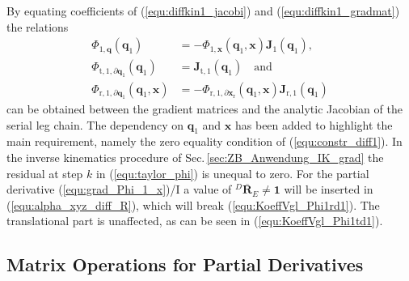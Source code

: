 \documentclass[robotics,article,submit,moreauthors,pdftex]{Definitions/mdpi}
\newcommand{\bm}[1]{\boldsymbol{#1}}
\newcommand{\rotmato}[2]{{{ }^{#1}\boldsymbol{\overline{R}}}_{#2}}
\let\Phi\varPhi
\begin{document}
%
By equating coefficients of (\ref{equ:diffkin1_jacobi}) and (\ref{equ:diffkin1_gradmat}) the relations
%
\begin{align}
\bm{\Phi}_{1,\bm{q}}(\bm{q}_1)
&=
-\bm{\Phi}_{1,\bm{x}}(\bm{q}_1,\bm{x})
\bm{J}_1(\bm{q}_1),
\label{equ:KoeffVgl_Phi1d1}
\\
\bm{\Phi}_{\mathrm{t},1,\partial\bm{q}_1}(\bm{q}_1)
&=
\bm{J}_{\mathrm{t},1}(\bm{q}_1)\quad\mathrm{and}
\label{equ:KoeffVgl_Phi1td1}
\\
\bm{\Phi}_{\mathrm{r},1,\partial\bm{q}_1}(\bm{q}_1,\bm{x})
&=
-\bm{\Phi}_{\mathrm{r},1,\partial\bm{x}_\mathrm{r}}(\bm{q}_1,\bm{x}) \bm{J}_{\mathrm{r},1}(\bm{q}_1)
\label{equ:KoeffVgl_Phi1rd1}
\end{align}
%
can be obtained between the gradient matrices and the analytic Jacobian of the serial leg chain.
The dependency on $\bm{q}_1$ and $\bm{x}$ has been added to highlight the main requirement, namely the zero equality condition of (\ref{equ:constr_diff1}).
In the inverse kinematics procedure of Sec.\,\ref{sec:ZB_Anwendung_IK_grad} the residual at step $k$ in (\ref{equ:taylor_phi}) is unequal to zero.
For the partial derivative (\ref{equ:grad_Phi_1_x})/I a value of $\rotmato{D}{E} \ne \bm{1}$ will be inserted in (\ref{equ:alpha_xyz_diff_R}), which will break (\ref{equ:KoeffVgl_Phi1rd1}).
The translational part is unaffected, as can be seen in (\ref{equ:KoeffVgl_Phi1td1}).

\subsection{Matrix Operations for Partial Derivatives}
\label{sec:appendix_gradient_matrix}
\end{document}
